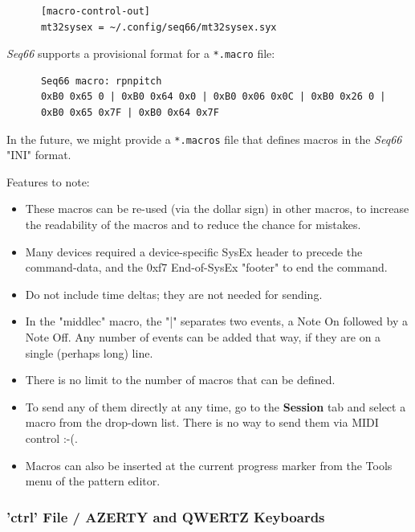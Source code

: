    \begin{verbatim}
      [macro-control-out]
      mt32sysex = ~/.config/seq66/mt32sysex.syx
   \end{verbatim}

   \textsl{Seq66} supports a provisional format for a
   \texttt{*.macro} file:

   \begin{verbatim}
      Seq66 macro: rpnpitch
      0xB0 0x65 0 | 0xB0 0x64 0x0 | 0xB0 0x06 0x0C | 0xB0 0x26 0 |
      0xB0 0x65 0x7F | 0xB0 0x64 0x7F
   \end{verbatim}

   In the future, we might provide a \texttt{*.macros} file that
   defines macros in the \textsl{Seq66} "INI" format.

   Features to note:

   \begin{itemize}
      \item These macros can be re-used (via the dollar sign) in other macros,
         to increase the readability of the macros and to reduce the chance for
         mistakes.
      \item Many devices required a device-specific SysEx header to precede the
         command-data, and the 0xf7 End-of-SysEx "footer" to end the command.
      \item Do not include time deltas; they are not needed for sending.
      \item In the "middlec" macro, the "|" separates two events, a Note On
         followed by a Note Off. Any number of events can be added that way,
         if they are on a single (perhaps long) line.
      \item There is no limit to the number of macros that can be defined.
      \item To send any of them directly at any time, go to the
         \textbf{Session} tab and select a macro from the drop-down list.
         There is no way to send them via MIDI control :-(.
      \item Macros can also be inserted at the current progress marker
         from the Tools menu of the pattern editor.
   \end{itemize}




\subsubsection{'ctrl' File / AZERTY and QWERTZ Keyboards}
\label{subsubsec:configuration_ctrl_azerty}

